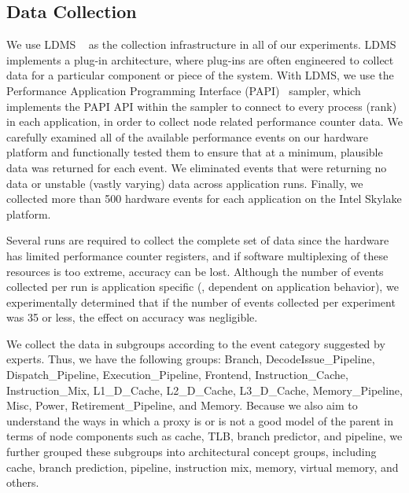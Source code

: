 \subsection{Data Collection}
\label{sec:collect}
We use LDMS ~\cite{ldms_sandia} as the collection infrastructure in all of our experiments. LDMS implements a plug-in architecture, where plug-ins are often engineered to collect data for a particular component or piece of the system. With LDMS, we use the Performance Application Programming Interface (PAPI)~\cite{terpstra2010collecting} sampler, which implements the PAPI API within the sampler to connect to every process (rank) in each application, in order to collect node related performance counter data. We carefully examined all of the available performance events on our hardware platform and functionally tested them to ensure that at a minimum, plausible data was returned for each event. We eliminated events that were returning no data or unstable (\ie vastly varying) data across application runs. Finally, we collected more than 500 hardware events for each application on the Intel Skylake platform.

Several runs are required to collect the complete set of data since the hardware has limited performance counter registers, and if software multiplexing of these resources is too extreme, accuracy can be lost. Although the number of events collected per run is application specific (\ie, dependent on application behavior), we experimentally determined that if the number of events collected per experiment was 35 or less, the effect on accuracy was negligible. 

We collect the data in subgroups according to the event category suggested by experts. Thus, we have the following groups: Branch, DecodeIssue\_Pipeline, Dispatch\_Pipeline, Execution\_Pipeline, Frontend, Instruction\_Cache, Instruction\_Mix, L1\_D\_Cache, L2\_D\_Cache, L3\_D\_Cache, Memory\_Pipeline, Misc, Power, Retirement\_Pipeline, and Memory. Because we also aim to understand the ways in which a proxy is or is not a good model of the parent in terms of node components such as cache, TLB, branch predictor, and pipeline, we further grouped these subgroups into architectural concept groups, including cache, branch prediction, pipeline, instruction mix, memory, virtual memory, and others.


